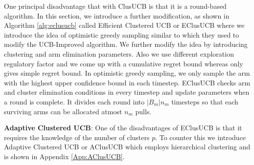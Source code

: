 One principal disadvantage that with ClusUCB is that it is a round-based algorithm. %
In this section, we introduce a further modification,  as shown in Algorithm \ref{alg:eclusucb} called Efficient Clustered UCB or EClusUCB where we introduce the idea of optimistic greedy sampling similar to \cite{liu2016modification} which they used to modify the UCB-Improved algorithm. We further modify the idea by introducing clustering and arm elimination parameters. Also we use different exploration regulatory factor and we come up with a cumulative regret bound whereas  \cite{liu2016modification} only gives simple regret bound. In optimistic greedy sampling, we only sample the arm with the highest upper confidence bound in each timestep. EClusUCB checks arm and cluster elimination conditions in every timestep and update parameters when a round is complete. It divides each round into $|B_{m}|n_{m}$ timesteps so that each surviving arms can be allocated atmost $n_{m}$ pulls. 

\textbf{Adaptive Clustered UCB}: One of the disadvantages of EClusUCB is that it requires the knowledge of the number of clusters $p$. To counter this we introduce Adaptive Clustered UCB or AClusUCB which employs hierarchical clustering and is shown in Appendix \ref{App:AClusUCB}.
